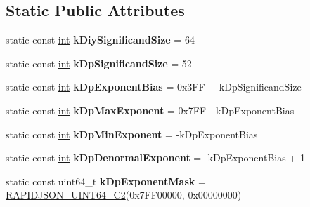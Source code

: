 \subsection*{Static Public Attributes}
\begin{DoxyCompactItemize}
\item 
\hypertarget{structinternal_1_1_diy_fp_aac30e0c32d43425ac403281fc9b0cee4}{}static const \hyperlink{_s_d_l__thread_8h_a6a64f9be4433e4de6e2f2f548cf3c08e}{int} {\bfseries k\+Diy\+Significand\+Size} = 64\label{structinternal_1_1_diy_fp_aac30e0c32d43425ac403281fc9b0cee4}

\item 
\hypertarget{structinternal_1_1_diy_fp_a037aed0fa0b66af0a13657418edef19e}{}static const \hyperlink{_s_d_l__thread_8h_a6a64f9be4433e4de6e2f2f548cf3c08e}{int} {\bfseries k\+Dp\+Significand\+Size} = 52\label{structinternal_1_1_diy_fp_a037aed0fa0b66af0a13657418edef19e}

\item 
\hypertarget{structinternal_1_1_diy_fp_a38b6f864ae0859d43fa96c3ff27959be}{}static const \hyperlink{_s_d_l__thread_8h_a6a64f9be4433e4de6e2f2f548cf3c08e}{int} {\bfseries k\+Dp\+Exponent\+Bias} = 0x3\+F\+F + k\+Dp\+Significand\+Size\label{structinternal_1_1_diy_fp_a38b6f864ae0859d43fa96c3ff27959be}

\item 
\hypertarget{structinternal_1_1_diy_fp_a80535a5594dae96fc482757a54162c7d}{}static const \hyperlink{_s_d_l__thread_8h_a6a64f9be4433e4de6e2f2f548cf3c08e}{int} {\bfseries k\+Dp\+Max\+Exponent} = 0x7\+F\+F -\/ k\+Dp\+Exponent\+Bias\label{structinternal_1_1_diy_fp_a80535a5594dae96fc482757a54162c7d}

\item 
\hypertarget{structinternal_1_1_diy_fp_a9ad1b0cdbab318e45d2bc48e64707ef3}{}static const \hyperlink{_s_d_l__thread_8h_a6a64f9be4433e4de6e2f2f548cf3c08e}{int} {\bfseries k\+Dp\+Min\+Exponent} = -\/k\+Dp\+Exponent\+Bias\label{structinternal_1_1_diy_fp_a9ad1b0cdbab318e45d2bc48e64707ef3}

\item 
\hypertarget{structinternal_1_1_diy_fp_a994f16a1247a290cfc3a875715e3a92b}{}static const \hyperlink{_s_d_l__thread_8h_a6a64f9be4433e4de6e2f2f548cf3c08e}{int} {\bfseries k\+Dp\+Denormal\+Exponent} = -\/k\+Dp\+Exponent\+Bias + 1\label{structinternal_1_1_diy_fp_a994f16a1247a290cfc3a875715e3a92b}

\item 
\hypertarget{structinternal_1_1_diy_fp_aaacbf068c44275f4451db750938bd1d3}{}static const uint64\+\_\+t {\bfseries k\+Dp\+Exponent\+Mask} = \hyperlink{rapidjson_8h_aaee1245f375a71be1ac9b8a07ba5fb8f}{R\+A\+P\+I\+D\+J\+S\+O\+N\+\_\+\+U\+I\+N\+T64\+\_\+\+C2}(0x7\+F\+F00000, 0x00000000)\label{structinternal_1_1_diy_fp_aaacbf068c44275f4451db750938bd1d3}


\end{DoxyCompactItemize}
